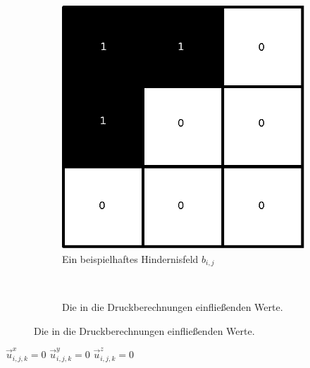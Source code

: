 \begin{figure}[ht]
	\begin{subfigure}[t]{0.5\textwidth}
		\centering
		\includegraphics[width=\textwidth]{images/boundary_field_for_pressure}
		\caption{Ein beispielhaftes Hindernisfeld $b_{i,j}$}
	\end{subfigure}
	~
	\begin{subfigure}[t]{0.5\textwidth}
		\centering
		\def\svgwidth{\textwidth}
		
		\caption{Die in die Druckberechnungen einfließenden Werte.}
	\label{fig:stam_modified_jacobi_algorithm}
	\end{subfigure}
\end{figure}

\begin{algorithm}
\caption{Die abschließende Erzwingung der Randbedingungen}
\begin{algorithmic}
			\State $\vec{u}_{i,j,k}^x = 0$
		\EndIf
			\State $\vec{u}_{i,j,k}^y = 0$
		\EndIf
			\State $\vec{u}_{i,j,k}^z = 0$
		\EndIf
	\EndFor
\EndFunction
\end{algorithmic}
\label{alg:stam_enforce_free_slip}
\end{algorithm}
